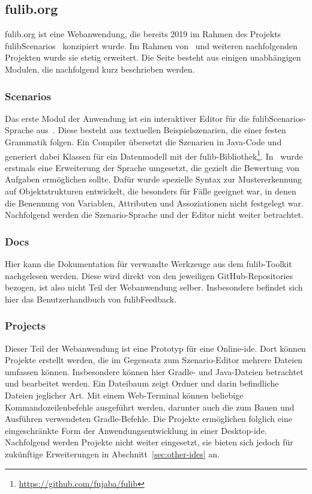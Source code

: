 \subsection{fulib.org}\label{subsec:fulib.org}

fulib.org ist eine Webanwendung, die bereits 2019 im Rahmen des Projekts fulibScenarios~\cite{explain} konzipiert wurde.
Im Rahmen von~\cite{bachelor-thesis} und weiteren nachfolgenden Projekten wurde sie stetig erweitert.
Die Seite besteht aus einigen unabhängigen Modulen, die nachfolgend kurz beschrieben werden.

\subsubsection{Scenarios}
Das erste Modul der Anwendung ist ein interaktiver Editor für die fulibScenarios-Sprache aus~\cite{explain}.
Diese besteht aus textuellen Beispielszenarien, die einer festen Grammatik folgen.
Ein Compiler übersetzt die Szenarien in Java-Code und generiert dabei Klassen für ein Datenmodell mit der fulib-Bibliothek\footnote{\url{https://github.com/fujaba/fulib}}.
In~\cite{bachelor-thesis} wurde erstmals eine Erweiterung der Sprache umgesetzt, die gezielt die Bewertung von Aufgaben ermöglichen sollte.
Dafür wurde spezielle Syntax zur Mustererkennung auf Objektstrukturen entwickelt, die besonders für Fälle geeignet war, in denen die Benennung von Variablen, Attributen und Assoziationen nicht festgelegt war.
Nachfolgend werden die Szenario-Sprache und der Editor nicht weiter betrachtet.

\subsubsection{Docs}
Hier kann die Dokumentation für verwandte Werkzeuge aus dem fulib-Toolkit nachgelesen werden.
Diese wird direkt von den jeweiligen GitHub-Repositories bezogen, ist also nicht Teil der Webanwendung selber.
Insbesondere befindet sich hier das Benutzerhandbuch von fulibFeedback.

\subsubsection{Projects}
Dieser Teil der Webanwendung ist eine Prototyp für eine Online-\ac{ide}.
Dort können Projekte erstellt werden, die im Gegensatz zum Szenario-Editor mehrere Dateien umfassen können.
Insbesondere können hier Gradle- und Java-Dateien betrachtet und bearbeitet werden.
Ein Dateibaum zeigt Ordner und darin befindliche Dateien jeglicher Art.
Mit einem Web-Terminal können beliebige Kommandozeilenbefehle ausgeführt werden, darunter auch die zum Bauen und Ausführen verwendeten Gradle-Befehle.
Die Projekte ermöglichen folglich eine eingeschränkte Form der Anwendungsentwicklung in einer Desktop-\ac{ide}.
Nachfolgend werden Projekte nicht weiter eingesetzt, sie bieten sich jedoch für zukünftige Erweiterungen in Abschnitt~\ref{sec:other-ides} an.

